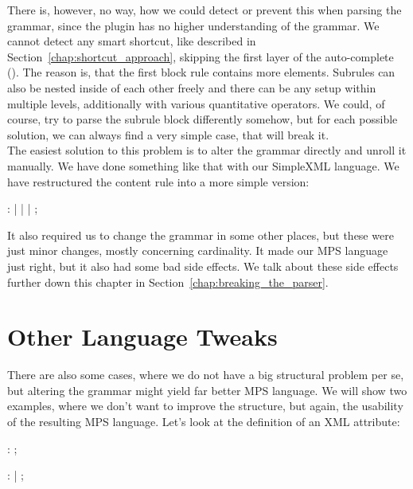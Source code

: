 There is, however, no way, how we could detect or prevent this when parsing the grammar, since the plugin has no higher understanding of the grammar.
We cannot detect any smart shortcut, like described in Section~\ref{chap:shortcut_approach}, skipping the first layer of the auto-complete ().
The reason is, that the first block rule contains more elements.
Subrules can also be nested inside of each other freely and there can be any setup within multiple levels, additionally with various quantitative operators.
We could, of course, try to parse the subrule block differently somehow, but for each possible solution, we can always find a very simple case, that will break it.
\\

The easiest solution to this problem is to alter the grammar directly and unroll it manually.
We have done something like that with our SimpleXML language.
We have restructured the content rule into a more simple version:

\begin{antlr}
	    :   
	           |   
	           |   
	           |   
	           ;
\end{antlr}

It also required us to change the grammar in some other places, but these were just minor changes, mostly concerning cardinality.
It made our MPS language just right, but it also had some bad side effects.
We talk about these side effects further down this chapter in Section~\ref{chap:breaking_the_parser}.

\section{Other Language Tweaks}

There are also some cases, where we do not have a big structural problem per se, but altering the grammar might yield far better MPS language.
We will show two examples, where we don't want to improve the structure, but again, the usability of the resulting MPS language.
Let's look at the definition of an XML attribute:

\begin{antlr}
	   :    \literal{=}  ;

	      :    \regex{~["]*} 
	            |    \regex{~[']*} 
	            ;
\end{antlr}

